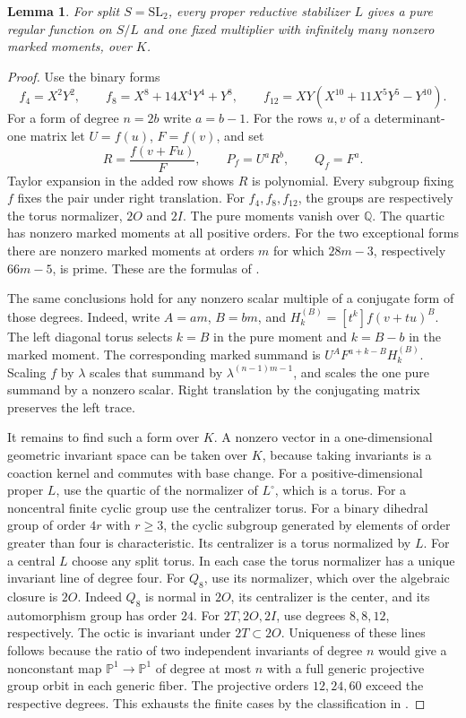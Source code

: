 \documentclass[11pt]{article}
\newtheorem{lemma}[theorem]{Lemma}
\newcommand{\QQ}{\mathbb Q}
\newcommand{\SL}{\mathrm{SL}}
\begin{document}
\begin{lemma}\label{lem:splitrank}
For split \(S=\SL_2\), every proper reductive stabilizer \(L\) gives
a pure regular function on \(S/L\) and one fixed multiplier with
infinitely many nonzero marked moments, over \(K\).
\end{lemma}

\begin{proof}
Use the binary forms
\[
 f_4=X^2Y^2,\qquad
 f_8=X^8+14X^4Y^4+Y^8,\qquad
 f_{12}=XY(X^{10}+11X^5Y^5-Y^{10}).
\]
For a form of degree \(n=2b\) write \(a=b-1\). For the rows \(u,v\)
of a determinant-one matrix let \(U=f(u)\), \(F=f(v)\), and set
\[
 R=\frac{f(v+Fu)}{F},\qquad P_f=U^aR^b,\qquad Q_f=F^a.
\]
Taylor expansion in the added row shows \(R\) is polynomial. Every
subgroup fixing \(f\) fixes the pair under right translation.
For \(f_4,f_8,f_{12}\), the groups are respectively the torus
normalizer, \(2O\) and \(2I\). The pure moments vanish over \(\QQ\).
The quartic has nonzero marked moments at all positive orders.
For the two exceptional forms there are nonzero marked moments at
orders \(m\) for which \(28m-3\), respectively \(66m-5\), is prime.
These are the formulas of \cite[Theorem~1.2 and Lemma~5.1]{Complex}.

The same conclusions hold for any nonzero scalar multiple of a conjugate
form of those degrees. Indeed, write \(A=am\), \(B=bm\), and
\(H_k^{(B)}=[t^k]f(v+tu)^B\). The left diagonal torus selects \(k=B\)
in the pure moment and \(k=B-b\) in the marked moment. The corresponding
marked summand is \(U^A F^{a+k-B}H_k^{(B)}\). Scaling \(f\) by \(\lambda\)
scales that summand by \(\lambda^{(n-1)m-1}\), and scales the one pure
summand by a nonzero scalar. Right translation by the conjugating
matrix preserves the left trace.

It remains to find such a form over \(K\). A nonzero vector in a
one-dimensional geometric invariant space can be taken over \(K\),
because taking invariants is a coaction kernel and commutes with base
change. For a positive-dimensional proper \(L\), use the quartic of
the normalizer of \(L^\circ\), which is a torus. For a noncentral
finite cyclic group use the centralizer torus. For a binary dihedral
group of order \(4r\) with \(r\ge3\), the cyclic subgroup generated by
elements of order greater than four is characteristic. Its centralizer
is a torus normalized by \(L\). For a central \(L\) choose any split
torus. In each case the torus normalizer has a unique invariant line
of degree four. For \(Q_8\), use its normalizer, which over the algebraic
closure is \(2O\). Indeed \(Q_8\) is normal in \(2O\), its centralizer
is the center, and its automorphism group has order \(24\).
For \(2T,2O,2I\), use degrees \(8,8,12\), respectively.
The octic is invariant under \(2T\subset 2O\). Uniqueness of these
lines follows because the ratio of two independent invariants of
degree \(n\) would give a nonconstant map \(\mathbb P^1\to\mathbb P^1\)
of degree at most \(n\) with a full generic projective group orbit in
each generic fiber. The projective orders \(12,24,60\) exceed the
respective degrees. This exhausts the finite cases by the classification
in \cite{Flicker}.
\end{proof}
\end{document}
